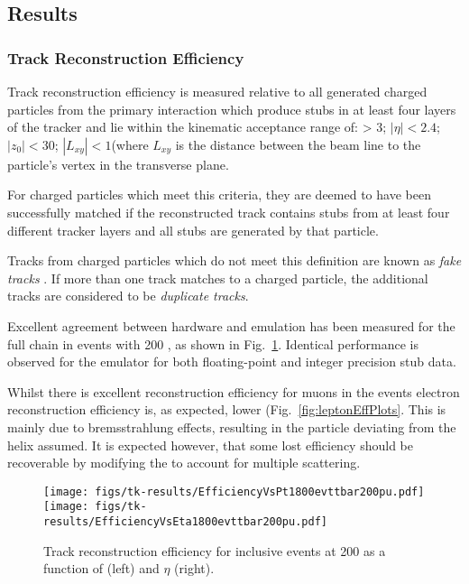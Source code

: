 \subsection{Results}
\subsubsection{Track Reconstruction Efficiency}

Track reconstruction efficiency is measured relative to all generated charged particles from the primary interaction which produce stubs in at least four layers of the tracker and lie within the kinematic acceptance range of: \pt > 3\GeV; $|\eta| < 2.4$; $|z_{0}|<30$\cm; $|L_{xy}|<1$\cm (where $L_{xy}$ is the distance between the beam line to the particle's vertex in the transverse plane.

For charged particles which meet this criteria, they are deemed to have been successfully matched if the reconstructed track contains stubs from at least four different tracker layers and all stubs are generated by that particle.

Tracks from charged particles which do not meet this definition are known as \textit{fake tracks	}. If more than one track matches to a charged particle, the additional tracks are considered to be \textit{duplicate tracks}.

Excellent agreement between hardware and emulation has been measured for the full chain in \ttbar events with 200 \PU, as shown in Fig.~\ref{fig:ttbarEffPlots}. Identical performance is observed for the emulator for both floating-point and integer precision stub data.

Whilst there is excellent reconstruction efficiency for muons in the \ttbar events electron reconstruction efficiency is, as expected, lower (Fig.~\ref{fig:leptonEffPlots}. This is mainly due to bremsstrahlung effects, resulting in the particle deviating from the helix assumed. It is expected however, that some lost efficiency should be recoverable by modifying the \KF to account for multiple scattering.

\begin{figure}[!t]
\centering
\texttt{[image: figs/tk-results/EfficiencyVsPt1800evttbar200pu.pdf]}
\hfill
\texttt{[image: figs/tk-results/EfficiencyVsEta1800evttbar200pu.pdf]}
\caption{Track reconstruction efficiency for inclusive \ttbar events at 200 \PU as a function of \pt (left) and $\eta$ (right).}
\label{fig:ttbarEffPlots}
\end{figure}

